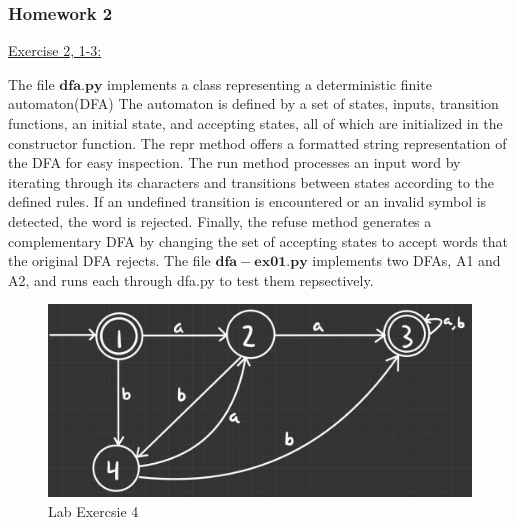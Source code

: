 \documentclass{article}
\theoremstyle{theorem}
\theoremstyle{definition}
\theoremstyle{remark}
\begin{document}
\subsubsection*{Homework 2}

\underline{Exercise 2, 1-3:}

The file $\mathbf{dfa.py}$ implements a class representing a deterministic finite automaton(DFA) The automaton is defined by a set of states, inputs, transition functions, an initial state, and accepting states, all of which are initialized in the constructor function. The repr method offers a formatted string representation of the DFA for easy inspection. The run method processes an input word by iterating through its characters and transitions between states according to the defined rules. If an undefined transition is encountered or an invalid symbol is detected, the word is rejected. Finally, the refuse method generates a complementary DFA by changing the set of accepting states to accept words that the original DFA rejects.
\newline
The file $\mathbf{dfa-ex01.py}$ implements two DFAs, A1 and A2, and runs each through dfa.py to test them repsectively.




\begin{figure}
\begin{center}
\includegraphics[scale=0.2]{attachments/LabExercise4.jpg}
\end{center}
\caption{Lab Exercsie 4}
\end{figure}
\end{document}
